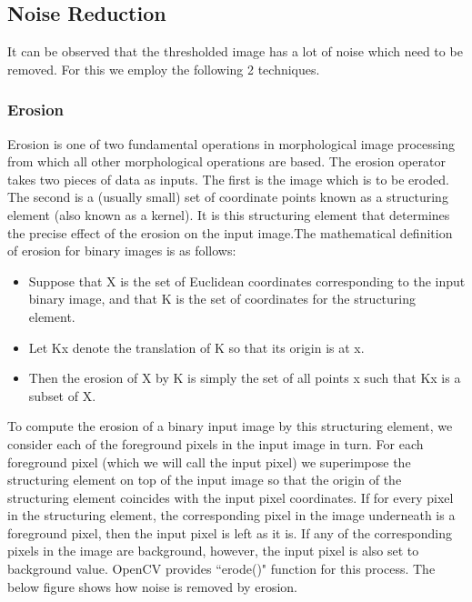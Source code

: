 \documentclass[12pt, a4paper]{article}
\begin{document}
\begin{large}\subsection{Noise Reduction}\end{large}
\hspace{3cm}
It can be observed that the thresholded image has a lot of noise which need to be removed. For this we employ the following 2 techniques.
\\
\begin{large}\subsubsection{Erosion}\end{large}
\hspace{3cm}
Erosion is one of two fundamental operations in morphological image processing from which all other morphological operations are based. The erosion operator takes two pieces of data as inputs. The first is the image which is to be eroded. The second is a (usually small) set of coordinate points known as a structuring element (also known as a kernel). It is this structuring element that determines the precise effect of the erosion on the input image.The mathematical definition of erosion for binary images is as follows:
\begin{itemize}
\item Suppose that X is the set of Euclidean coordinates corresponding to the input binary image, and that K is the set of coordinates for the structuring element.
\item Let Kx denote the translation of K so that its origin is at x.
\item Then the erosion of X by K is simply the set of all points x such that Kx is a subset of X.
\end{itemize}
To compute the erosion of a binary input image by this structuring element, we consider each of the foreground pixels in the input image in turn. For each foreground pixel (which we will call the input pixel) we superimpose the structuring element on top of the input image so that the origin of the structuring element coincides with the input pixel coordinates. If for every pixel in the structuring element, the corresponding pixel in the image underneath is a foreground pixel, then the input pixel is left as it is. If any of the corresponding pixels in the image are background, however, the input pixel is also set to background value. OpenCV provides ``erode()" function for this process. The below figure shows how noise is removed by erosion.
\end{document}
